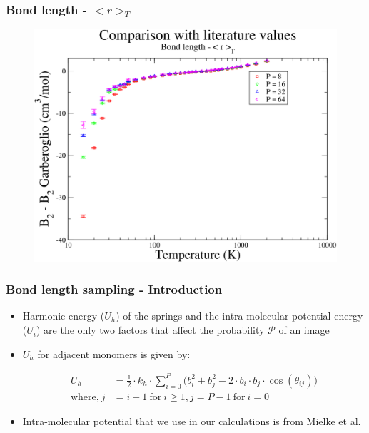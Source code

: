 \documentclass[xcolor=svgnames]{beamer}
\begin{document}
	\begin{frame}
	\frametitle{Bond length - $< r >_T$}
	\begin{figure}
	\centering
	\includegraphics[scale=0.18,keepaspectratio]{8sfTAResultsDiff.png}
	\end{figure}
	
	\end{frame}

	\begin{frame}
	\frametitle{Bond length sampling - Introduction}
	\begin{itemize}
	\justifying
	\item Harmonic energy ($U_h$) of the springs and the intra-molecular potential energy ($U_i$) are the only two factors that affect the probability $\mathcal{P}$ of an image
	\item $U_h$ for adjacent monomers is given by:
	\begin{figure}
	\centering
	\def\svgscale{0.2}
	
	\end{figure}
	\begin{equation*}
	\begin{aligned}
	U_h &= \frac{1}{2} \cdot k_h \cdot \displaystyle\sum\limits_{i=0}^P \Big( b_i^2 + b_j^2 - 2 \cdot b_i \cdot b_j \cdot \cos (\theta_{ij}) \Big)\\
	\text{where,} \: j &= i - 1 \: \text{for} \: i \ge 1 , j = P - 1\: \text{for} \: i = 0
	\end{aligned}
	\end{equation*}
	\item Intra-molecular potential that we use in our calculations is from Mielke et al.\putCitation{Mielke2002}
	\end{itemize}
	\end{frame}
\end{document}
